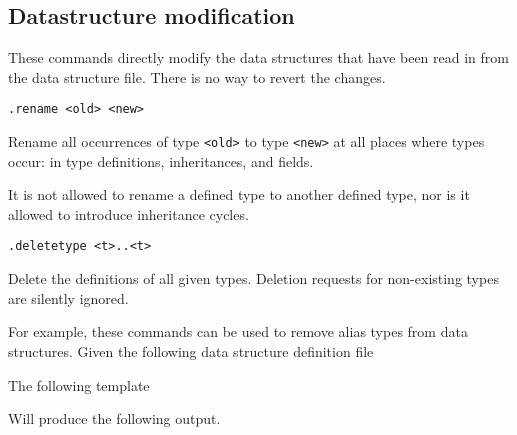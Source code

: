 \subsection{Datastructure modification}
These commands directly modify the data structures that have been
read in from the data structure file. There is no way to revert the
changes.
\begin{verbatim}
.rename <old> <new>
\end{verbatim}
\begin{desc}
Rename all occurrences of type \verb'<old>' to type \verb'<new>' at
all places where types occur: in type definitions, inheritances,
and fields.

It is not allowed to rename a defined type to another defined type,
nor is it allowed to introduce inheritance cycles.
\end{desc}
\begin{verbatim}
.deletetype <t>..<t>
\end{verbatim}
\begin{desc}
Delete the definitions of all given types. Deletion requests for
non-existing types are silently ignored.
\end{desc}
For example, these commands can be used to remove alias types from
data structures. Given the following data structure definition file
\begin{showfile}

\end{showfile}
The following template
\begin{showfile}

\end{showfile}
Will produce the following output.
\begin{showfile}

\end{showfile}

